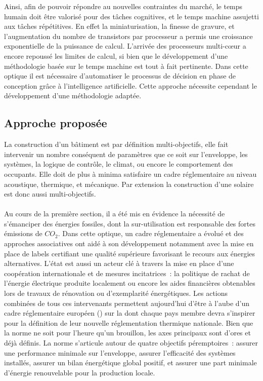Ainsi, afin de pouvoir répondre au nouvelles contraintes du marché, le temps humain doit
être valorisé pour des tâches cognitives, et le temps machine assujetti aux tâches
répétitives. En effet la miniaturisation, la finesse de gravure, et l’augmentation du
nombre de transistors par processeur a permis une croissance exponentielle de la puissance
de calcul. L’arrivée des processeurs multi-cœur a encore repoussé les limites de calcul,
si bien que le développement d’une méthodologie basée sur le temps machine est tout à fait
pertinente. Dans cette optique il est nécessaire d’automatiser le processus de décision en
phase de conception grâce à l’intelligence artificielle. Cette approche nécessite cependant
le développement d’une méthodologie adaptée.


\subsection{Approche proposée} %
\label{sub:approche_proposee}
La construction d’un bâtiment est par définition multi-objectifs, elle fait intervenir un
nombre conséquent de paramètres que ce soit sur l’enveloppe, les systèmes, la logique de
contrôle, le climat, ou encore le comportement des occupants. Elle doit de plus à minima
satisfaire un cadre réglementaire au niveau acoustique, thermique, et mécanique. Par extension
la construction d’une  solaire est donc aussi multi-objectifs.

\paragraph{} %
Au cours de la première section, il a été mis en évidence la nécessité de s’émanciper des
énergies fossiles, dont la sur-utilisation est responsable des fortes émissions de
$CO_{2}$. Dans cette optique, un cadre réglementaire a évolué et des approches
associatives ont aidé à son développement notamment avec la mise en place de labels
certifiant une qualité supérieure favorisant le recours aux énergies alternatives. L’état est
aussi un acteur clé à travers la mise en place d’une coopération internationale et de
mesures incitatrices~: la politique de rachat de l’énergie électrique produite localement
ou encore les aides financières obtenables lors de travaux de rénovation ou d’exemplarité
énergétiques. Les actions combinées de tous ces intervenants permettent
aujourd’hui d’être à l’aube d’un cadre réglementaire européen () sur la
 dont chaque pays membre devra s’inspirer pour la définition de leur nouvelle
réglementation thermique nationale. Bien que la norme ne soit pour l’heure qu’un
brouillon, les axes principaux sont d’ores et déjà définis. La norme s’articule autour de
quatre objectifs péremptoires~: assurer une performance minimale sur l’enveloppe, assurer
l’efficacité des systèmes installés, assurer un bilan énergétique global positif, et
assurer une part minimale d’énergie renouvelable pour la production locale.


